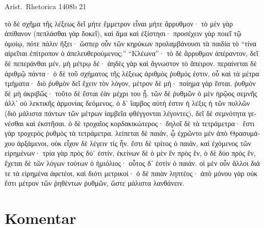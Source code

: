 Arist.\ Rhetorica 1408b 21


\medskip

{\large
\begin{greek}
\noindent τὸ δὲ σχῆμα τῆς λέξεως δεῖ μήτε ἔμμετρον εἶναι μήτε ἄρρυθμον· τὸ μὲν γὰρ ἀπίθανον (πεπλάσθαι γὰρ δοκεῖ), καὶ ἅμα καὶ ἐξίστησι· προσέχειν γὰρ ποιεῖ τῷ ὁμοίῳ, πότε πάλιν ἥξει· ὥσπερ οὖν τῶν κηρύκων προλαμβάνουσι τὰ παιδία τὸ ``τίνα αἱρεῖται ἐπίτροπον ὁ ἀπελευθερούμενος;'' ``Κλέωνα''· τὸ δὲ ἄρρυθμον ἀπέραντον, δεῖ δὲ πεπεράνθαι μέν, μὴ μέτρῳ δέ· ἀηδὲς γὰρ καὶ ἄγνωστον τὸ ἄπειρον. περαίνεται δὲ ἀριθμῷ πάντα· ὁ δὲ τοῦ σχήματος τῆς λέξεως ἀριθμὸς ῥυθμός ἐστιν, οὗ καὶ τὰ μέτρα τμήματα· διὸ ῥυθμὸν δεῖ ἔχειν τὸν λόγον, μέτρον δὲ μή· ποίημα γὰρ ἔσται. ῥυθμὸν δὲ μὴ ἀκριβῶς· τοῦτο δὲ ἔσται ἐὰν μέχρι του ᾖ. τῶν δὲ ῥυθμῶν ὁ μὲν ἡρῷος σεμνῆς ἀλλ᾽ οὐ λεκτικῆς ἁρμονίας δεόμενος, ὁ δ᾽ ἴαμβος αὐτή ἐστιν ἡ λέξις ἡ τῶν πολλῶν (διὸ μάλιστα πάντων τῶν μέτρων ἰαμβεῖα φθέγγονται λέγοντες), δεῖ δὲ σεμνότητα γενέσθαι καὶ ἐκστῆσαι. ὁ δὲ τροχαῖος κορδακικώτερος· δηλοῖ δὲ τὰ τετράμετρα· ἔστι γὰρ τροχερὸς ῥυθμὸς τὰ τετράμετρα. λείπεται δὲ παιάν, ᾧ ἐχρῶντο μὲν ἀπὸ Θρασυμάχου ἀρξάμενοι, οὐκ εἶχον δὲ λέγειν τίς ἦν. ἔστι δὲ τρίτος ὁ παιάν, καὶ ἐχόμενος τῶν εἰρημένων· τρία γὰρ πρὸς δύ᾽ ἐστίν, ἐκείνων δὲ ὁ μὲν ἓν πρὸς ἕν, ὁ δὲ δύο πρὸς ἕν, ἔχεται δὲ τῶν λόγων τούτων ὁ ἡμιόλιος· οὗτος δ᾽ ἐστὶν ὁ παιάν. οἱ μὲν οὖν ἄλλοι διά τε τὰ εἰρημένα ἀφετέοι, καὶ διότι μετρικοί· ὁ δὲ παιὰν ληπτέος· ἀπὸ μόνου γὰρ οὐκ ἔστι μέτρον τῶν ῥηθέντων ῥυθμῶν, ὥστε μάλιστα λανθάνειν.

\end{greek}
}

\newpage

\section*{Komentar}


